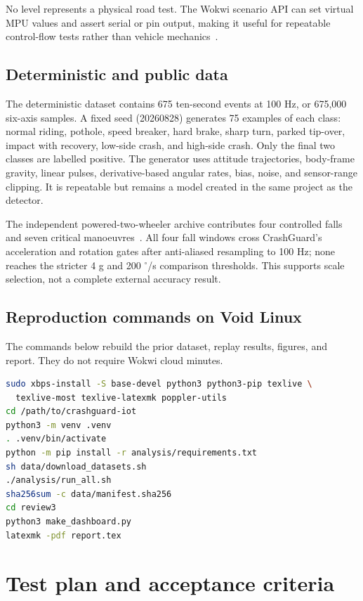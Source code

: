 \documentclass[12pt,a4paper]{article}
\newcommand{\degree}{\ensuremath{^{\circ}}}
\begin{document}
No level represents a physical road test. The Wokwi scenario API can set
virtual MPU values and assert serial or pin output, making it useful for
repeatable control-flow tests rather than vehicle mechanics~\cite{wokwiscenarios}.

\subsection{Deterministic and public data}

The deterministic dataset contains 675 ten-second events at 100 Hz, or
675,000 six-axis samples. A fixed seed (20260828) generates 75 examples of
each class: normal riding, pothole, speed breaker, hard brake, sharp turn,
parked tip-over, impact with recovery, low-side crash, and high-side crash.
Only the final two classes are labelled positive. The generator uses attitude
trajectories, body-frame gravity, linear pulses, derivative-based angular
rates, bias, noise, and sensor-range clipping. It is repeatable but remains a
model created in the same project as the detector.

The independent powered-two-wheeler archive contributes four controlled falls
and seven critical manoeuvres~\cite{boubezoul2013algorithm,boubezoul2019dataset}.
All four fall windows cross CrashGuard's acceleration and rotation gates after
anti-aliased resampling to 100 Hz; none reaches the stricter 4 g and
200 $\degree$/s comparison thresholds. This supports scale selection, not a
complete external accuracy result.

\subsection{Reproduction commands on Void Linux}

The commands below rebuild the prior dataset, replay results, figures, and
report. They do not require Wokwi cloud minutes.

\begin{lstlisting}[language=bash]
sudo xbps-install -S base-devel python3 python3-pip texlive \
  texlive-most texlive-latexmk poppler-utils
cd /path/to/crashguard-iot
python3 -m venv .venv
. .venv/bin/activate
python -m pip install -r analysis/requirements.txt
sh data/download_datasets.sh
./analysis/run_all.sh
sha256sum -c data/manifest.sha256
cd review3
python3 make_dashboard.py
latexmk -pdf report.tex
\end{lstlisting}

\section{Test plan and acceptance criteria}
\label{sec:testplan}
\end{document}
